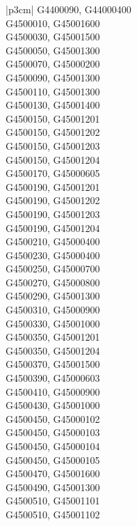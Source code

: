 \begin{customLongTable}{ |p{3cm}| }
G4400090, G44000400 \\ \hline
G4500010, G45001600 \\ \hline
G4500030, G45001500 \\ \hline
G4500050, G45001300 \\ \hline
G4500070, G45000200 \\ \hline
G4500090, G45001300 \\ \hline
G4500110, G45001300 \\ \hline
G4500130, G45001400 \\ \hline
G4500150, G45001201 \\ \hline
G4500150, G45001202 \\ \hline
G4500150, G45001203 \\ \hline
G4500150, G45001204 \\ \hline
G4500170, G45000605 \\ \hline
G4500190, G45001201 \\ \hline
G4500190, G45001202 \\ \hline
G4500190, G45001203 \\ \hline
G4500190, G45001204 \\ \hline
G4500210, G45000400 \\ \hline
G4500230, G45000400 \\ \hline
G4500250, G45000700 \\ \hline
G4500270, G45000800 \\ \hline
G4500290, G45001300 \\ \hline
G4500310, G45000900 \\ \hline
G4500330, G45001000 \\ \hline
G4500350, G45001201 \\ \hline
G4500350, G45001204 \\ \hline
G4500370, G45001500 \\ \hline
G4500390, G45000603 \\ \hline
G4500410, G45000900 \\ \hline
G4500430, G45001000 \\ \hline
G4500450, G45000102 \\ \hline
G4500450, G45000103 \\ \hline
G4500450, G45000104 \\ \hline
G4500450, G45000105 \\ \hline
G4500470, G45001600 \\ \hline
G4500490, G45001300 \\ \hline
G4500510, G45001101 \\ \hline
G4500510, G45001102 \\ \hline

\end{customLongTable}
